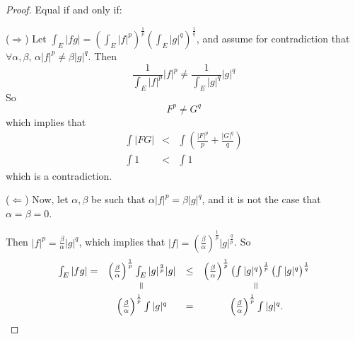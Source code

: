 \begin{pblm}
\begin{proof}
	Equal if and only if: 
	
	\noindent ($\Rightarrow$) Let 
	$\int_E|fg| = \left(\int_E|f|^p\right)^\frac{1}{p}\left(\int_E|g|^q\right)^\frac{1}{q}$, 
	and assume for contradiction that 
	$\forall \alpha, \beta$, $\alpha|f|^p \neq \beta|g|^q$. Then 
	\begin{equation*}
		\frac{1}{\int_E|f|^p}|f|^p \neq \frac{1}{\int_E|g|^q}|g|^q 
	\end{equation*}
	So 
	\begin{equation*}
		F^p \neq G^q
	\end{equation*}
	which implies that 
	\begin{equation*}
	\begin{array}{rcl}
		\int|FG| &<& \int \left(\frac{|F|^p}{p} + \frac{|G|^q}{q}\right)\\
		\int 1 &<& \int 1
	\end{array}
	\end{equation*}
	which is a contradiction. 

	\noindent ($\Leftarrow$) Now, let $\alpha, \beta$ be such that $\alpha|f|^p = \beta|g|^q$, and 
	it is not the case that $\alpha = \beta = 0$. 

	Then $|f|^p = \frac{\beta}{\alpha}|g|^q$, which implies that 
	$|f| = \left(\frac{\beta}{\alpha}\right)^\frac{1}{p}|g|^\frac{q}{p}$. 
	So 
	\begin{equation*}
	\begin{array}{lccc}
		\int_E|fg| = & \left(\frac{\beta}{\alpha}\right)^\frac{1}{p}\int_E|g|^\frac{q}{p}|g| & \le & 
		\left(\frac{\beta}{\alpha}\right)^\frac{1}{p}\left(\int|g|^q\right)^\frac{1}{p} 
		\left(\int|g|^q\right)^\frac{1}{q}\\
		& \verteq & & \verteq \\
		& \left(\frac{\beta}{\alpha}\right)^\frac{1}{p}\int|g|^q & = & \left(\frac{\beta}{\alpha}\right)^\frac{1}{p}\int|g|^q. 
	\end{array}
	\end{equation*}
\end{proof}
\end{pblm}

